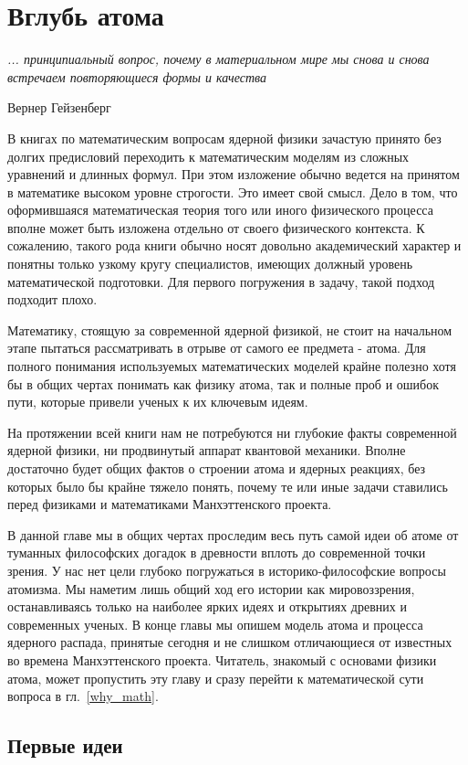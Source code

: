 \chapter{Вглубь атома}

\epigraph{\emph{... принципиальный вопрос, почему в материальном мире мы снова и снова встречаем повторяющиеся формы и качества}}
{Вернер Гейзенберг}

В книгах по математическим вопросам ядерной физики зачастую принято без долгих предисловий переходить к математическим моделям из сложных уравнений и длинных формул.
При этом изложение обычно ведется на принятом в математике высоком уровне строгости.
Это имеет свой смысл.
Дело в том, что оформившаяся математическая теория того или иного физического процесса вполне может быть изложена отдельно от своего физического контекста.
К сожалению, такого рода книги обычно носят довольно академический характер и понятны только узкому кругу специалистов, имеющих должный уровень математической подготовки. Для первого погружения в задачу, такой подход подходит плохо.

Математику, стоящую за современной ядерной физикой, не стоит на начальном этапе пытаться рассматривать в отрыве от самого ее предмета - атома.
Для полного понимания используемых математических моделей крайне полезно хотя бы в общих чертах понимать как физику атома, так и полные проб и ошибок пути, которые привели ученых к их ключевым идеям.
  
На протяжении всей книги нам не потребуются ни глубокие факты современной ядерной физики, ни продвинутый аппарат квантовой механики.
Вполне достаточно будет общих фактов о строении атома и ядерных реакциях, без которых было бы крайне тяжело понять, почему те или иные задачи ставились перед физиками и математиками Манхэттенского проекта.

В данной главе мы в общих чертах проследим весь путь самой идеи об атоме от туманных философских догадок в древности вплоть до современной точки зрения. 
У нас нет цели глубоко погружаться в историко-философские вопросы атомизма.
Мы наметим лишь общий ход его истории как мировоззрения, останавливаясь только на наиболее ярких идеях и открытиях древних и современных ученых.
В конце главы мы опишем модель атома и процесса ядерного распада, принятые сегодня и не слишком отличающиеся от известных во времена Манхэттенского проекта.
Читатель, знакомый с основами физики атома, может пропустить эту главу и сразу перейти к математической сути вопроса в гл.~\ref{why_math}.


\section*{Первые идеи}

